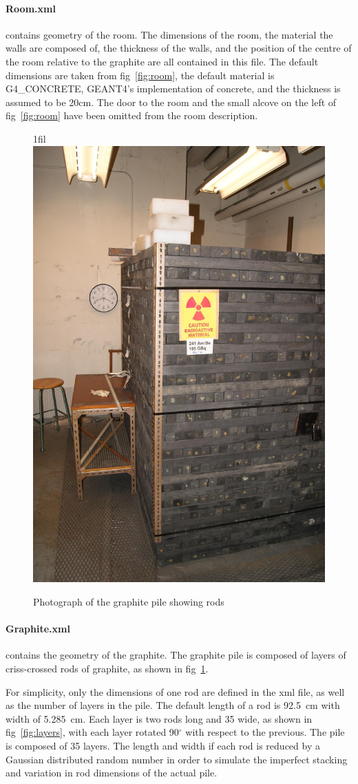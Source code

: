 \documentclass{article}
\makeatletter
\newcommand*{\centerfloat}{%
  \parindent \z@
  \leftskip \z@ \@plus 1fil \@minus \textwidth
  \rightskip\leftskip
  \parfillskip \z@skip}
\makeatother
\begin{document}
	\paragraph{Room.xml} contains geometry of the room. The dimensions of the room, the material the walls are composed of, the thickness of the walls, and the position of the centre of the room relative to the graphite are all contained in this file. The default dimensions are taken from fig~\ref{fig:room}, the default 
material is G4\_CONCRETE, GEANT4's implementation of concrete, and the thickness is assumed to be 20cm. The door to the room and the small alcove on the left of fig~\ref{fig:room} have been omitted from the room description.

\begin{figure}
	\centerfloat
	\includegraphics[width=0.5\columnwidth]{images/Rods}
	\caption{Photograph of the graphite pile showing rods}	
	\label{fig:graphiteRods}
\end{figure}

	\paragraph{Graphite.xml} contains the geometry of the graphite. The graphite pile is composed of layers of criss-crossed rods of graphite, as shown in fig~\ref{fig:graphiteRods}. 

	For simplicity, only the dimensions of one rod are defined in the xml file, as well as the number of layers in the pile. The default length of a rod is 92.5~cm with width of 5.285~cm. Each layer is two rods long and 35 wide, as shown in fig~\ref{fig:layers}, with each layer rotated 90$^{\circ}$ with respect to the previous. The pile is composed of 35 layers. The length and width if each rod is reduced by a Gaussian distributed random number in order to simulate the imperfect stacking and variation in rod dimensions of the actual pile. 
\end{document}
